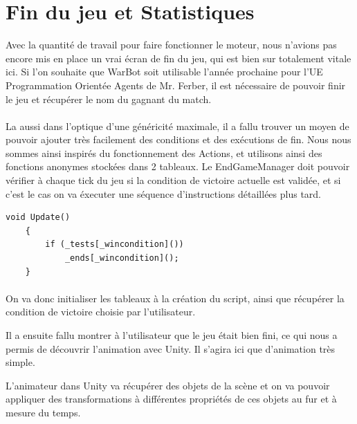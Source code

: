 \documentclass{report}
\begin{document}
\paragraph{}
\newpage


\section{Fin du jeu et Statistiques}

Avec la quantité de travail pour faire fonctionner le moteur, nous n’avions pas encore mis en place un vrai écran de fin du jeu, qui est bien sur totalement vitale ici. Si l’on souhaite que WarBot soit utilisable l’année prochaine pour l’UE Programmation Orientée Agents de Mr. Ferber, il est nécessaire de pouvoir finir le jeu et récupérer le nom du gagnant du match.
\paragraph{}
La aussi dans l’optique d’une généricité maximale, il a fallu trouver un moyen de pouvoir ajouter très facilement des conditions et des exécutions de fin.
Nous nous sommes ainsi inspirés du fonctionnement des Actions, et  utilisons ainsi des fonctions anonymes stockées dans 2 tableaux. 
Le EndGameManager doit pouvoir vérifier à chaque tick du jeu si la condition de victoire actuelle est validée, et si c’est le cas on va éxecuter une séquence d’instructions détaillées plus tard.

\begin{lstlisting}[frame=single]
void Update()
    {
        if (_tests[_wincondition]())
            _ends[_wincondition]();
    }
\end{lstlisting}
\paragraph{}

On va donc initialiser les tableaux à la création du script, ainsi que récupérer la condition de victoire choisie par l’utilisateur.

Il  a ensuite fallu montrer à l’utilisateur que le jeu était bien fini, ce qui nous a permis de découvrir l’animation avec Unity. Il s’agira ici que d’animation très simple. 

L’animateur dans Unity va récupérer des objets de la scène et on va pouvoir appliquer des transformations à différentes propriétés de ces objets au fur et à mesure du temps. 
\end{document}
